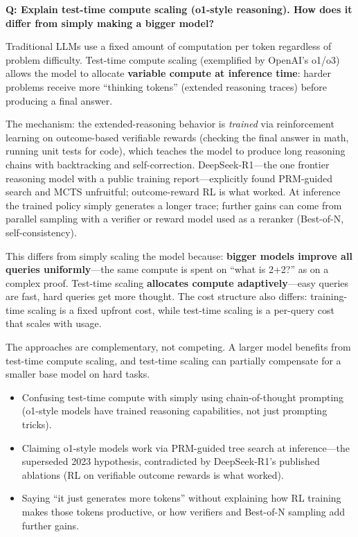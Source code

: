 \begin{interviewq}
\textbf{Q: Explain test-time compute scaling (o1-style reasoning). How does
it differ from simply making a bigger model?}

 \quad {} \quad
\badgefreq{\freqmed}

\stronganswer
Traditional LLMs use a fixed amount of computation per token regardless of
problem difficulty.  Test-time compute scaling (exemplified by OpenAI's o1/o3)
allows the model to allocate \textbf{variable compute at inference time}:
harder problems receive more ``thinking tokens'' (extended reasoning traces)
before producing a final answer.

The mechanism: the extended-reasoning behavior is \emph{trained} via
reinforcement learning on outcome-based verifiable rewards (checking the
final answer in math, running unit tests for code), which teaches the model
to produce long reasoning chains with backtracking and self-correction.
DeepSeek-R1---the one frontier reasoning model with a public training
report---explicitly found PRM-guided search and MCTS unfruitful; outcome-reward
RL is what worked.  At inference the trained policy simply generates a longer
trace; further gains can come from parallel sampling with a verifier or
reward model used as a reranker (Best-of-N, self-consistency).

This differs from simply scaling the model because: \textbf{bigger models
improve all queries uniformly}---the same compute is spent on ``what is
2+2?'' as on a complex proof.  Test-time scaling \textbf{allocates compute
adaptively}---easy queries are fast, hard queries get more thought.  The
cost structure also differs: training-time scaling is a fixed upfront cost,
while test-time scaling is a per-query cost that scales with usage.

The approaches are complementary, not competing.  A larger model benefits
from test-time compute scaling, and test-time scaling can partially
compensate for a smaller base model on hard tasks.

\redflags
\begin{itemize}
\item Confusing test-time compute with simply using chain-of-thought
  prompting (o1-style models have trained reasoning capabilities, not
  just prompting tricks).
\item Claiming o1-style models work via PRM-guided tree search at
  inference---the superseded 2023 hypothesis, contradicted by DeepSeek-R1's
  published ablations (RL on verifiable outcome rewards is what worked).
\item Saying ``it just generates more tokens'' without explaining how RL
  training makes those tokens productive, or how verifiers and Best-of-N
  sampling add further gains.
\end{itemize}


\end{interviewq}
